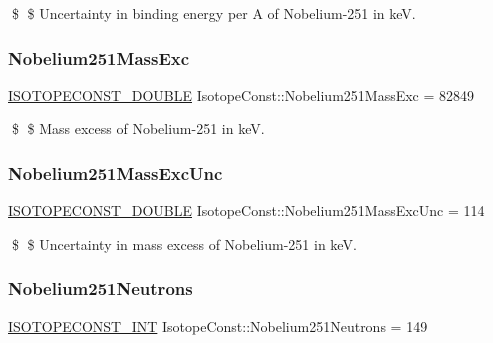 \$ \$ Uncertainty in binding energy per A of Nobelium-\/251 in keV. \mbox{\label{group___isotope_const-_nobelium-_no251_ga1d5cd5aa5acf83381565bdda9dd7dfb2}} 
\subsubsection{\texorpdfstring{Nobelium251\+Mass\+Exc}{Nobelium251MassExc}}
{\footnotesize\ttfamily \mbox{\hyperlink{group___isotope_const-_macros_ga8f45a7272ce02c0b4c65c44636ed719a}{I\+S\+O\+T\+O\+P\+E\+C\+O\+N\+S\+T\+\_\+\+D\+O\+U\+B\+LE}} Isotope\+Const\+::\+Nobelium251\+Mass\+Exc = 82849}

\$ \$ Mass excess of Nobelium-\/251 in keV. \mbox{\label{group___isotope_const-_nobelium-_no251_gac68b8fa1f418c007a6cf57f786388ae0}} 
\subsubsection{\texorpdfstring{Nobelium251\+Mass\+Exc\+Unc}{Nobelium251MassExcUnc}}
{\footnotesize\ttfamily \mbox{\hyperlink{group___isotope_const-_macros_ga8f45a7272ce02c0b4c65c44636ed719a}{I\+S\+O\+T\+O\+P\+E\+C\+O\+N\+S\+T\+\_\+\+D\+O\+U\+B\+LE}} Isotope\+Const\+::\+Nobelium251\+Mass\+Exc\+Unc = 114}

\$ \$ Uncertainty in mass excess of Nobelium-\/251 in keV. \mbox{\label{group___isotope_const-_nobelium-_no251_ga6cbf0012d396d8a8a628f7ed221885ea}} 
\subsubsection{\texorpdfstring{Nobelium251\+Neutrons}{Nobelium251Neutrons}}
{\footnotesize\ttfamily \mbox{\hyperlink{group___isotope_const-_macros_ga5f18360b3e99483a35c32d789e62621c}{I\+S\+O\+T\+O\+P\+E\+C\+O\+N\+S\+T\+\_\+\+I\+NT}} Isotope\+Const\+::\+Nobelium251\+Neutrons = 149}

